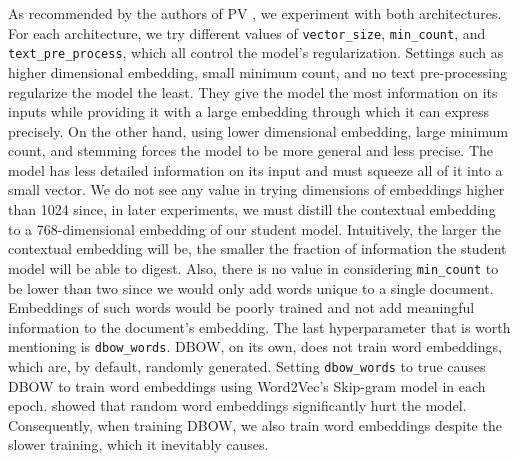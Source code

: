 As recommended by the authors of PV \citep{le2014distributed}, we experiment
with both architectures. For each architecture, we try different values of
\texttt{vector\_size}, \texttt{min\_count}, and \texttt{text\_pre\_process},
which all control the model's regularization. Settings such as higher
dimensional embedding, small minimum count, and no text pre-processing
regularize the model the least. They give the model the most information on its
inputs while providing it with a large embedding through which it
can express precisely. On the other hand, using lower dimensional embedding,
large minimum count, and stemming forces the model to be
more general and less precise. The model has less detailed information on its
input and must squeeze all of it into a small vector. We do not see any value in
trying dimensions of embeddings higher than 1024 since, in later experiments, we
must distill the contextual embedding to a 768-dimensional embedding of our
student model. Intuitively, the larger the contextual embedding will be,
the smaller the fraction of information the student model will be able
to digest. Also, there is no value in considering \texttt{min\_count} to be
lower than two since we would only add words unique to a single
document. Embeddings of such words would be poorly trained and not add
meaningful information to the document's embedding. The last hyperparameter that is
worth mentioning is \texttt{dbow\_words}. DBOW, on its own, does not train word
embeddings, which are, by default, randomly generated. Setting \texttt{dbow\_words} to true
causes DBOW to train word embeddings using Word2Vec's Skip-gram model
\citep{mikolov2013efficient} in each epoch. \cite{lau2016empirical} showed that
random word embeddings significantly hurt the model. Consequently, when
training DBOW, we also train word embeddings despite the slower training, which
it inevitably causes.


